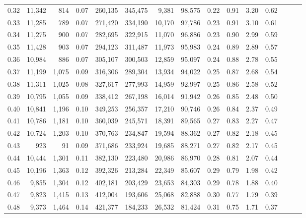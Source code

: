 \begin{tabular}{rrrrrrrrrrrrrrr}
0.32 &  11,342 &    814 &  0.07 &  260,135 &  345,475 &    9,381 &   98,575 &  0.22 &  0.91 &  3.20 &      0.62 \\
0.33 &  11,285 &    789 &  0.07 &  271,420 &  334,190 &   10,170 &   97,786 &  0.23 &  0.91 &  3.10 &      0.61 \\
0.34 &  11,275 &    900 &  0.07 &  282,695 &  322,915 &   11,070 &   96,886 &  0.23 &  0.90 &  2.99 &      0.59 \\
0.35 &  11,428 &    903 &  0.07 &  294,123 &  311,487 &   11,973 &   95,983 &  0.24 &  0.89 &  2.89 &      0.57 \\
0.36 &  10,984 &    886 &  0.07 &  305,107 &  300,503 &   12,859 &   95,097 &  0.24 &  0.88 &  2.78 &      0.55 \\
0.37 &  11,199 &  1,075 &  0.09 &  316,306 &  289,304 &   13,934 &   94,022 &  0.25 &  0.87 &  2.68 &      0.54 \\
0.38 &  11,311 &  1,025 &  0.08 &  327,617 &  277,993 &   14,959 &   92,997 &  0.25 &  0.86 &  2.58 &      0.52 \\
0.39 &  10,795 &  1,055 &  0.09 &  338,412 &  267,198 &   16,014 &   91,942 &  0.26 &  0.85 &  2.48 &      0.50 \\
0.40 &  10,841 &  1,196 &  0.10 &  349,253 &  256,357 &   17,210 &   90,746 &  0.26 &  0.84 &  2.37 &      0.49 \\
0.41 &  10,786 &  1,181 &  0.10 &  360,039 &  245,571 &   18,391 &   89,565 &  0.27 &  0.83 &  2.27 &      0.47 \\
0.42 &  10,724 &  1,203 &  0.10 &  370,763 &  234,847 &   19,594 &   88,362 &  0.27 &  0.82 &  2.18 &      0.45 \\
0.43 &     923 &     91 &  0.09 &  371,686 &  233,924 &   19,685 &   88,271 &  0.27 &  0.82 &  2.17 &      0.45 \\
0.44 &  10,444 &  1,301 &  0.11 &  382,130 &  223,480 &   20,986 &   86,970 &  0.28 &  0.81 &  2.07 &      0.44 \\
0.45 &  10,196 &  1,363 &  0.12 &  392,326 &  213,284 &   22,349 &   85,607 &  0.29 &  0.79 &  1.98 &      0.42 \\
0.46 &   9,855 &  1,304 &  0.12 &  402,181 &  203,429 &   23,653 &   84,303 &  0.29 &  0.78 &  1.88 &      0.40 \\
0.47 &   9,823 &  1,415 &  0.13 &  412,004 &  193,606 &   25,068 &   82,888 &  0.30 &  0.77 &  1.79 &      0.39 \\
0.48 &   9,373 &  1,464 &  0.14 &  421,377 &  184,233 &   26,532 &   81,424 &  0.31 &  0.75 &  1.71 &      0.37 \\

\end{tabular}
